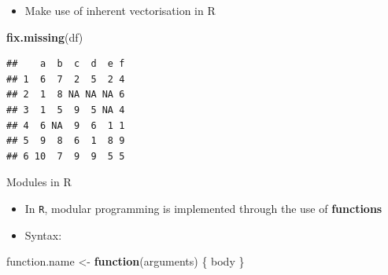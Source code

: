 \documentclass[ignorenonframetext,]{beamer}
\newenvironment{Shaded}{\begin{snugshade}}{\end{snugshade}}
\newcommand{\KeywordTok}[1]{\textcolor[rgb]{0.13,0.29,0.53}{\textbf{#1}}}
\newcommand{\StringTok}[1]{\textcolor[rgb]{0.31,0.60,0.02}{#1}}
\newcommand{\ControlFlowTok}[1]{\textcolor[rgb]{0.13,0.29,0.53}{\textbf{#1}}}
\newcommand{\NormalTok}[1]{#1}
\providecommand{\tightlist}{%
  \setlength{\itemsep}{0pt}\setlength{\parskip}{0pt}}
\begin{document}
\begin{frame}[fragile]

\begin{itemize}[<+->]
\tightlist
\item
  Make use of inherent vectorisation in R
\end{itemize}

\begin{Shaded}
\begin{Highlighting}[]
\KeywordTok{fix.missing}\NormalTok{(df)}
\end{Highlighting}
\end{Shaded}

\begin{verbatim}
##    a  b  c  d  e f
## 1  6  7  2  5  2 4
## 2  1  8 NA NA NA 6
## 3  1  5  9  5 NA 4
## 4  6 NA  9  6  1 1
## 5  9  8  6  1  8 9
## 6 10  7  9  9  5 5
\end{verbatim}

\end{frame}

\begin{frame}[fragile]{Modules in R}

\begin{itemize}[<+->]
\tightlist
\item
  In \texttt{R}, modular programming is implemented through the use of
  \textbf{functions}
\item
  Syntax:
\end{itemize}

\begin{Shaded}
\begin{Highlighting}[]
\NormalTok{function.name <-}\StringTok{ }\ControlFlowTok{function}\NormalTok{(arguments) \{}
\NormalTok{  body}
\NormalTok{\}}
\end{Highlighting}
\end{Shaded}

\end{frame}
\end{document}
